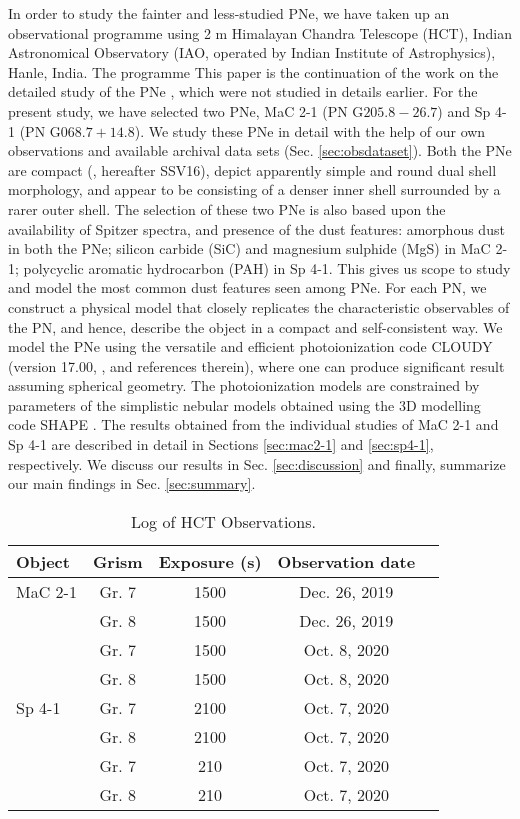 \documentclass[a4paper,fleqn,usenatbib]{mnras}
\begin{document}
In order to study the fainter and less-studied PNe, we have taken up an observational programme using 2 m Himalayan Chandra Telescope (HCT), Indian Astronomical Observatory (IAO, operated by Indian Institute of Astrophysics), Hanle, India. The programme 
This paper is the continuation of the work on the detailed study of the PNe \citep{10.1093/mnras/staa1518}, which were not studied in details earlier. For the present study, we have selected two PNe, MaC 2-1 (PN G$205.8-26.7$) and Sp 4-1 (PN G$068.7+14.8$). We study these PNe in detail with the help of our own observations and available archival data sets (Sec. \ref{sec:obsdataset}).
Both the PNe are compact (\citealt{2016ApJ...830...33S}, hereafter SSV16), depict apparently simple and round dual shell morphology, and appear to be consisting of a denser inner shell surrounded by a rarer outer shell. The selection of these two PNe is also based upon the availability of Spitzer spectra, and presence of the dust features: amorphous dust in both the PNe; silicon carbide (SiC) and magnesium sulphide (MgS) in MaC 2-1; polycyclic aromatic hydrocarbon (PAH) in Sp 4-1. This gives us scope to study and model the most common dust features seen among PNe. For each PN, we construct a physical model that closely replicates the characteristic observables of the PN, and hence, describe the object in a compact and self-consistent way. We model the PNe using the versatile and efficient photoionization code CLOUDY (version 17.00, \citealt{2017RMxAA..53..385F}, and references therein), where one can produce significant result assuming spherical geometry. The photoionization models are constrained by parameters of the simplistic nebular models obtained using the 3D modelling code SHAPE \citep{2011ITVCG..17..454S}. The results obtained from the individual studies of MaC 2-1 and Sp 4-1 are described in detail in Sections \ref{sec:mac2-1} and \ref{sec:sp4-1}, respectively. We discuss our results in Sec. \ref{sec:discussion} and finally, summarize our main findings in Sec. \ref{sec:summary}.

\begin{table}
\centering
\small
\caption{Log of HCT Observations. \label{tab:logobs}}
\begin{tabular}{l c c c c}
\hline
Object & Grism & Exposure (s) & Observation date\\
\hline
MaC 2-1 & Gr. 7 & 1500 & Dec. 26, 2019\\
& Gr. 8 & 1500 & Dec. 26, 2019\\
& Gr. 7 & 1500 & Oct. 8, 2020\\
& Gr. 8 & 1500 & Oct. 8, 2020\\
Sp 4-1 & Gr. 7 & 2100 & Oct. 7, 2020\\
& Gr. 8 & 2100 & Oct. 7, 2020\\
& Gr. 7 & 210 & Oct. 7, 2020\\
& Gr. 8 & 210 & Oct. 7, 2020\\
\hline
\end{tabular}
\end{table}
\end{document}
